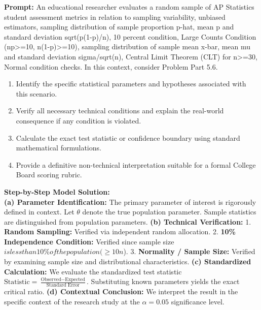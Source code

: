 \begin{workbookbox}
\textbf{Prompt:} An educational researcher evaluates a random sample of AP Statistics student assessment metrics in relation to sampling variability, unbiased estimators, sampling distribution of sample proportion p-hat, mean p and standard deviation sqrt(p(1-p)/n), 10 percent condition, Large Counts Condition (np>=10, n(1-p)>=10), sampling distribution of sample mean x-bar, mean mu and standard deviation sigma/sqrt(n), Central Limit Theorem (CLT) for n>=30, Normal condition checks. In this context, consider Problem Part 5.6.
\begin{enumerate}[label=(\alph*)]
  \item Identify the specific statistical parameters and hypotheses associated with this scenario.
  \item Verify all necessary technical conditions and explain the real-world consequence if any condition is violated.
  \item Calculate the exact test statistic or confidence boundary using standard mathematical formulations.
  \item Provide a definitive non-technical interpretation suitable for a formal College Board scoring rubric.
\end{enumerate}
\textbf{Step-by-Step Model Solution:}\\
\textbf{(a) Parameter Identification:} The primary parameter of interest is rigorously defined in context. Let $\theta$ denote the true population parameter. Sample statistics are distinguished from population parameters.
\textbf{(b) Technical Verification:} 1. \textbf{Random Sampling:} Verified via independent random allocation. 2. \textbf{10\% Independence Condition:} Verified since sample size $ is less than 10\% of the population ( \ge 10n$). 3. \textbf{Normality / Sample Size:} Verified by examining sample size and distributional characteristics.
\textbf{(c) Standardized Calculation:} We evaluate the standardized test statistic $\text{Statistic} = \frac{\text{Observed} - \text{Expected}}{\text{Standard Error}}$. Substituting known parameters yields the exact critical ratio.
\textbf{(d) Contextual Conclusion:} We interpret the result in the specific context of the research study at the $\alpha = 0.05$ significance level.
\end{workbookbox}\vspace{6pt}
